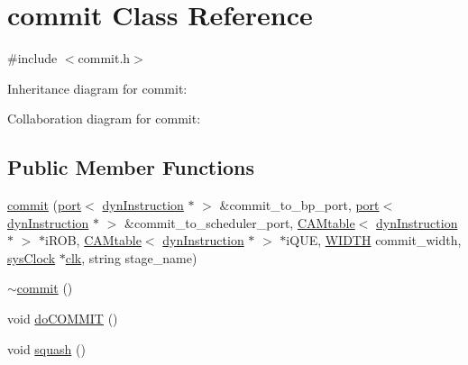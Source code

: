 \hypertarget{classcommit}{
\section{commit Class Reference}
\label{classcommit}
}


{\ttfamily \#include $<$commit.h$>$}



Inheritance diagram for commit:


Collaboration diagram for commit:
\subsection*{Public Member Functions}
\begin{DoxyCompactItemize}
\item 
\hyperlink{classcommit_a0dfedb170a782a4e32b587ed0afd0285}{commit} (\hyperlink{classport}{port}$<$ \hyperlink{classdynInstruction}{dynInstruction} $\ast$ $>$ \&commit\_\-to\_\-bp\_\-port, \hyperlink{classport}{port}$<$ \hyperlink{classdynInstruction}{dynInstruction} $\ast$ $>$ \&commit\_\-to\_\-scheduler\_\-port, \hyperlink{classCAMtable}{CAMtable}$<$ \hyperlink{classdynInstruction}{dynInstruction} $\ast$ $>$ $\ast$iROB, \hyperlink{classCAMtable}{CAMtable}$<$ \hyperlink{classdynInstruction}{dynInstruction} $\ast$ $>$ $\ast$iQUE, \hyperlink{global_2global_8h_a6fa2e24b8a418fa215e183264cbea3aa}{WIDTH} commit\_\-width, \hyperlink{classsysClock}{sysClock} $\ast$\hyperlink{g__objs_8h_afc4784c140eed1743728e83840e91c12}{clk}, string stage\_\-name)
\item 
\hyperlink{classcommit_a56b8656334cc14f0f7c9f8f0d7021417}{$\sim$commit} ()
\item 
void \hyperlink{classcommit_a29f74b9268950cc7c7b7f259793502d6}{doCOMMIT} ()
\item 
void \hyperlink{classcommit_a5b183f343dbf7da45d795df16ef4b7bb}{squash} ()
\end{DoxyCompactItemize}


